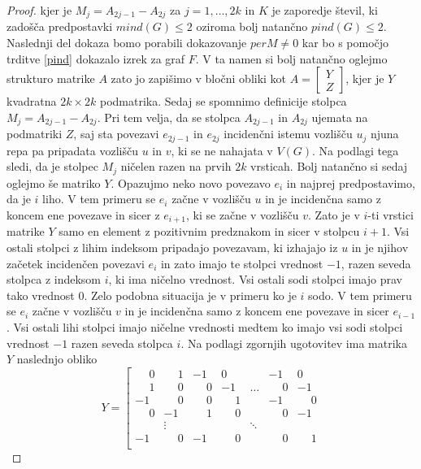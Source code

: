 \documentclass[12pt,a4paper,twoside]{article}
\theoremstyle{definition} %
\theoremstyle{plain} %
\numberwithin{equation}{section}  %
\newcommand{\Z}{\mathbb Z}
\begin{document}
\begin{proof}
kjer je $M_j = A_{2j - 1} - A_{2j}$ za $j=1, \ldots, 2k$ in $K$ je zaporedje števil, ki zadošča predpostavki $mind(G) \le 2$ oziroma bolj natančno $pind(G) \le 2$. Naslednji del dokaza bomo porabili dokazovanje $perM \neq 0$ kar bo s pomočjo trditve \ref{pind} dokazalo izrek za graf $F$. V ta namen si bolj natančno oglejmo strukturo matrike $A$ zato jo zapišimo v bločni obliki kot $ A=\begin{bmatrix}Y \\Z \end{bmatrix}  $, kjer je $Y$ kvadratna $2k \times 2k$ podmatrika. Sedaj se spomnimo definicije stolpca $M_j = A_{2j - 1} - A_{2j}$. Pri tem velja, da se stolpca $A_{2j - 1}$ in $A_{2j}$ ujemata na podmatriki $Z$, saj sta povezavi $e_{2j - 1}$ in $e_{2j}$ incidenčni istemu vozlišču $u_j$ njuna repa pa pripadata vozlišču $u$ in $v$, ki se ne nahajata v $V(G)$. Na podlagi tega sledi, da je stolpec $M_j$ ničelen razen na prvih $2k$ vrsticah. Bolj natančno si sedaj oglejmo še matriko $Y$. Opazujmo neko novo povezavo $e_i$ in najprej predpostavimo, da je $i$ liho. V tem primeru se  $e_i$ začne v vozlišču $u$ in je incidenčna samo z koncem ene povezave in sicer z $e_{i+1}$, ki se začne v vozlišču $v$. Zato je v $i$-ti vrstici matrike $Y$ samo en element z pozitivnim predznakom in sicer v stolpcu $i+1$. Vsi ostali stolpci z lihim indeksom pripadajo povezavam, ki izhajajo iz $u$ in je njihov začetek incidenčen povezavi $e_i$ in zato imajo te stolpci vrednost $-1$, razen seveda stolpca z indeksom $i$, ki ima ničelno vrednost. Vsi ostali sodi stolpci imajo prav tako vrednost $0$. Zelo podobna situacija je v primeru ko je $i$ sodo. V tem primeru se $e_i$ začne v vozlišču $v$ in je incidenčna samo z koncem ene povezave in sicer $e_{i-1}$. Vsi ostali lihi stolpci imajo ničelne vrednosti medtem ko imajo vsi sodi stolpci vrednost $-1$ razen seveda stolpca $i$. Na podlagi zgornjih ugotovitev ima matrika $Y$ naslednjo obliko
$$ Y= \left[ \begin{matrix} 
\phantom{-}0 & \phantom{-}1 & -1 & 0 &  & -1 & 0 \\
 \phantom{-}1 &\phantom{-} 0 & \phantom{-}0 & -1 & \ldots  & \phantom{-}0 & -1 \\ 
-1 & \phantom{-}0 & \phantom{-}0 & \phantom{-}1 &  & -1 & \phantom{-}0 \\ 
\phantom{-}0 & -1 & \phantom{-}1 & \phantom{-}0 &  & \phantom{-}0 & -1 \\ 
 & \vdots &  &  & \ddots &  &  \\ 
-1 & \phantom{-}0 & -1 & \phantom{-}0 &  & \phantom{-}0 & \phantom{-}1 \\ 

\end{matrix}$$
\end{proof}
\end{document}
